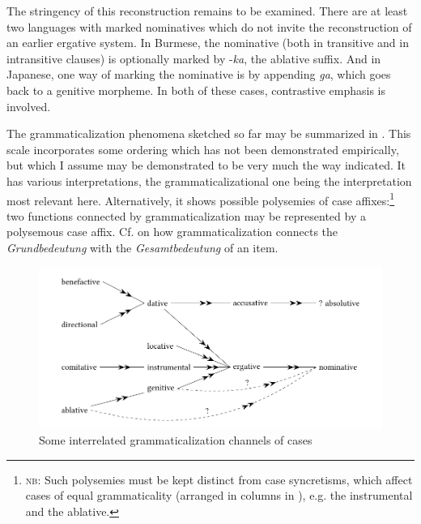 The stringency of this reconstruction remains to be examined. There are at least two languages with marked nominatives which do not invite the reconstruction of an earlier ergative system. In Burmese, the nominative (both in transitive and in intransitive clauses) is optionally marked by -\textit{ka}, the ablative suffix. And in Japanese, one way of marking the nominative is by appending \textit{ga}, which goes back to a genitive morpheme. In both of these cases, contrastive emphasis is involved.

The grammaticalization phenomena sketched so far may be summarized in . This scale incorporates some ordering which has not been demonstrated empirically, but which I assume may be demonstrated to be very much the way indicated. It has various interpretations, the grammaticalizational one being the interpretation most relevant here. Alternatively, it shows possible polysemies of case affixes:\footnote{\textsc{nb}: Such polysemies must be kept distinct from case syncretisms, which affect cases of equal grammaticality (arranged in columns in ), e.g. the instrumental and the ablative.} two functions connected by grammaticalization may be represented by a polysemous case affix. Cf.  on how grammaticalization connects the \textit{Grundbedeutung} with the \textit{Gesamtbedeutung} of an item.

\begin{figure}
\includegraphics[width=.9\textwidth]{figures/8-someinterrelated.pdf}
\caption{Some interrelated grammaticalization channels of cases} \label{F8}
\end{figure}


